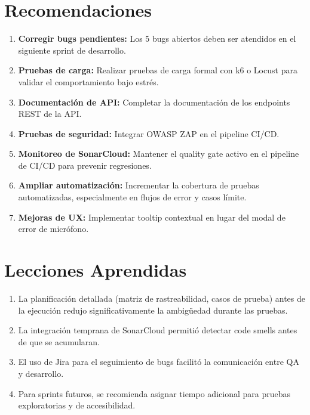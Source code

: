 \section{Recomendaciones}
\label{sec:recomendaciones}

\begin{enumerate}
    \item \textbf{Corregir bugs pendientes:} Los 5 bugs abiertos deben ser atendidos en el siguiente sprint de desarrollo.
    \item \textbf{Pruebas de carga:} Realizar pruebas de carga formal con k6 o Locust para validar el comportamiento bajo estrés.
    \item \textbf{Documentación de API:} Completar la documentación de los endpoints REST de la API.
    \item \textbf{Pruebas de seguridad:} Integrar OWASP ZAP en el pipeline CI/CD.
    \item \textbf{Monitoreo de SonarCloud:} Mantener el quality gate activo en el pipeline de CI/CD para prevenir regresiones.
    \item \textbf{Ampliar automatización:} Incrementar la cobertura de pruebas automatizadas, especialmente en flujos de error y casos límite.
    \item \textbf{Mejoras de UX:} Implementar tooltip contextual en lugar del modal de error de micrófono.
\end{enumerate}

\section{Lecciones Aprendidas}
\label{sec:lecciones}

\begin{enumerate}
    \item La planificación detallada (matriz de rastreabilidad, casos de prueba) antes de la ejecución redujo significativamente la ambigüedad durante las pruebas.
    \item La integración temprana de SonarCloud permitió detectar code smells antes de que se acumularan.
    \item El uso de Jira para el seguimiento de bugs facilitó la comunicación entre QA y desarrollo.
    \item Para sprints futuros, se recomienda asignar tiempo adicional para pruebas exploratorias y de accesibilidad.
\end{enumerate}
